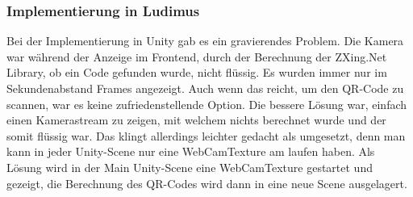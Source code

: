 \subsubsection{Implementierung in Ludimus}
Bei der Implementierung in Unity gab es ein gravierendes Problem. Die Kamera war während der Anzeige im Frontend, durch der Berechnung der ZXing.Net Library, ob ein Code gefunden wurde, nicht flüssig. Es wurden immer nur im Sekundenabstand Frames angezeigt. Auch wenn das reicht, um den QR-Code zu scannen, war es keine zufriedenstellende Option. Die bessere Lösung war, einfach einen Kamerastream zu zeigen, mit welchem nichts berechnet wurde und der somit flüssig war. Das klingt allerdings leichter gedacht als umgesetzt, denn man kann in jeder Unity-Scene nur eine WebCamTexture am laufen haben. Als Lösung wird in der Main Unity-Scene eine WebCamTexture gestartet und gezeigt, die Berechnung des QR-Codes wird dann in eine neue Scene ausgelagert. 
